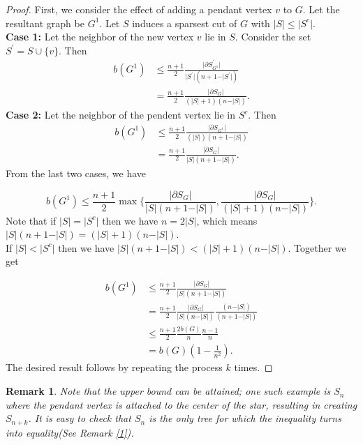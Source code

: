 \documentclass[12pt]{article}
\newtheorem{remark}{Remark}[section]
\begin{document}
\begin{proof}
First, we consider the effect of adding a pendant vertex $v$ to $G$.  Let the resultant graph be $G^1$. Let $S$ induces a sparsest cut of $G$ with $\vert S\vert \leq \vert S^c \vert$.\\
\textbf{Case 1:} Let the neighbor of the new vertex $v$ lie in $S$. Consider the set $S^{\prime}=S \cup \{v\}$. Then
\begin{align*}
b(G^1) &\leq \frac{n+1}{2} \frac{\vert \partial S^{\prime}_{G^1}\vert}{\vert S^{\prime}\vert(n+1-\vert S^{\prime}\vert)}\\
&= \frac{n+1}{2} \frac{\vert \partial S_{G}\vert}{(\vert S\vert+1)(n-\vert S\vert)}  .  
\end{align*}
\textbf{Case 2:} Let the neighbor of the pendent vertex lie in $S^c$. Then
\begin{align*}
   b(G^1) &\leq \frac{n+1}{2} \frac{\vert \partial S_{G^1}\vert}{(\vert S \vert )(n+1-\vert S \vert)}\\
    &=\frac{n+1}{2} \frac{\vert \partial S_{G}\vert}{\vert S \vert (n+1-\vert S \vert)} . 
\end{align*}
From the last two cases, we have

$$
b(G^1) \leq \frac{n+1}{2} \max \{ \frac{\vert \partial S_{G} \vert}{\vert S\vert (n+1-\vert S \vert )}, \frac{\vert \partial S_{G} \vert }{(\vert S\vert+1)(n-\vert S \vert )}\}.
$$
Note that if $\vert S \vert =\vert S^c \vert $ then we have $n=2\vert S \vert $, which means $\vert S \vert (n+1-\vert S \vert )=(\vert S \vert +1)(n-\vert S \vert )$.\\
If $\vert S \vert < \vert S^c \vert$ then we have $\vert S \vert(n+1-\vert S \vert)< (\vert S \vert +1)(n-\vert S \vert)$. Together we get

\begin{align*}
b(G^1) & \leq \frac{n+1}{2} \frac{\vert \partial S_{G}\vert}{\vert S \vert (n+1-\vert S \vert)}\\
& =\frac{n+1}{2} \frac{\vert \partial S_{G} \vert }{\vert S \vert (n-\vert S \vert )} \frac{(n-\vert S \vert )}{(n+1-\vert S \vert )}\\
& \leq \frac{n+1}{2} \frac{2b(G)}{n} \frac{n-1}{n}\\
&=b(G) (1-\frac{1}{n^2}).
\end{align*}
The desired result follows by repeating the process $k$ times.
\end{proof}
 
\begin{remark}
Note that the upper bound can be attained; one such example is $S_n$ where the pendant vertex is attached to the center of the star, resulting in creating $S_{n+k}$. It is easy to check that $S_n$ is the only tree for which the inequality turns into equality(See Remark \ref{1}).
\end{remark}
\end{document}
